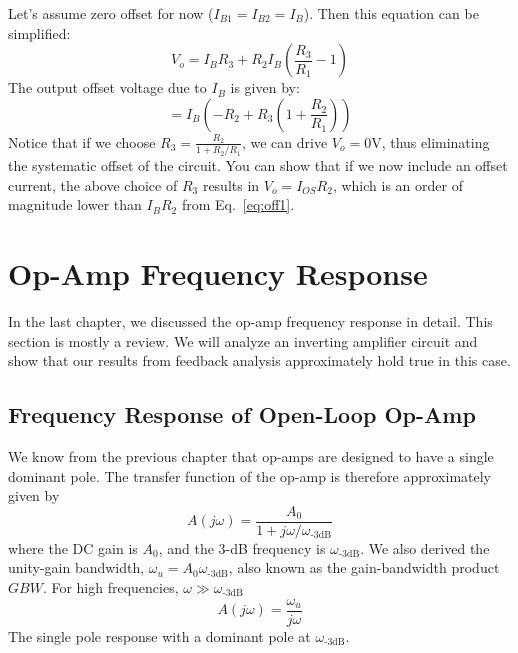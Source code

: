 \noindent Let's assume zero offset for now ($I_{B1} = I_{B2} = I_B$).  Then this equation can be simplified:
%
\begin{equation}
      V_o = I_{B} R_3 + R_2 I_B \left( \frac{R_3}{R_1} - 1 \right)
\end{equation}
%
The output offset voltage due to $I_B$ is given by:
%
\begin{equation}
       = I_{B}  \left( -R_2 + R_3\left(1+ \frac{R_2}{R_1}  \right)  \right)
\end{equation}
%
Notice that if we choose $R_3 = \frac{R_2}{1 + R_2/R_1}$, we can drive $V_o = 0$V, thus eliminating the systematic offset of the circuit.  You can show that if we now include an offset current, the above choice of $R_3$ results in $V_o = I_{OS} R_2 $, which is an order of magnitude lower than $I_B R_2$ from Eq.~\ref{eq:off1}.




\section{Op-Amp Frequency Response}

In the last chapter, we discussed the op-amp frequency response in detail. This section is mostly a review.  We will analyze an inverting amplifier circuit and show that our results from feedback analysis approximately hold true in this case.

\subsection{Frequency Response of Open-Loop Op-Amp}


We know from the previous chapter that op-amps are designed to have a single dominant pole.  The transfer function of the op-amp is therefore approximately given by
%
\begin{equation} 
	A(j\omega) = \frac{A_0}{1 + j\omega/\omega_\text{-3dB}} 
\end{equation}
%
where the DC gain is $A_0$, and the 3-dB frequency is $\omega_{\text{-3dB}}$.  We also derived the unity-gain bandwidth, $\omega_u = A_0 \omega_{\text{-3dB}}$, also known as the  gain-bandwidth product $GBW$.  For high frequencies, $\omega \gg \omega_{\text{-3dB}}$
%
\begin{equation}
  A(j\omega) = \frac{\omega_u}{j\omega}
\end{equation}
%
The single pole response with a dominant pole at $\omega_{\text{-3dB}}$.






